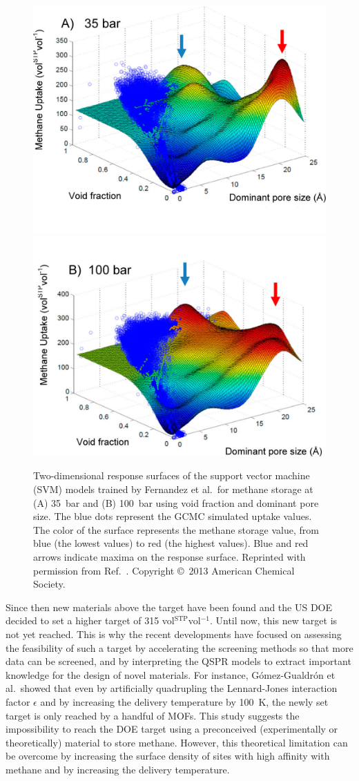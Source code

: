 \documentclass[main.tex]{subfiles}
\begin{document}
\begin{figure}[ht]
\centering
  \includegraphics[width=0.48\linewidth]{figures/1-screening/Fernandez_2013_feature_1.jpg}
  \includegraphics[width=0.48\linewidth]{figures/1-screening/Fernandez_2013_feature_2.jpg}
  \caption{Two-dimensional response surfaces of the support vector machine (SVM) models trained by Fernandez et al.\ for methane storage at (A) 35~bar and (B) 100~bar using void fraction and dominant pore size. The blue dots represent the GCMC simulated uptake values. The color of the surface represents the methane storage value, from blue (the lowest values) to red (the highest values). Blue and red arrows indicate maxima on the response surface. Reprinted with permission from Ref.~\cite{Fernandez_2013}. Copyright \copyright\  2013 American Chemical Society.}\label{fgr:Fernandez_2013}
\end{figure}

Since then new materials above the target have been found and the US DOE decided to set a higher target of 315 vol{\footnotesize$^\mathrm{STP}$}vol$^{-1}$. Until now, this new target is not yet reached. This is why the recent developments have focused on assessing the feasibility of such a target by accelerating the screening methods so that more data can be screened, and by interpreting the QSPR models to extract important knowledge for the design of novel materials. For instance, G{\'{o}}mez-Gualdr{\'{o}}n et al.\ showed that even by artificially quadrupling the Lennard-Jones interaction factor $\epsilon$ and by increasing the delivery temperature by \SI{100}{\kelvin}, the newly set target is only reached by a handful of MOFs.\autocite{Gomez_Gualdron_2014} This study suggests the impossibility to reach the DOE target using a preconceived (experimentally or theoretically) material to store methane. However, this theoretical limitation can be overcome by increasing the surface density of sites with high affinity with methane and by increasing the delivery temperature.
\end{document}
